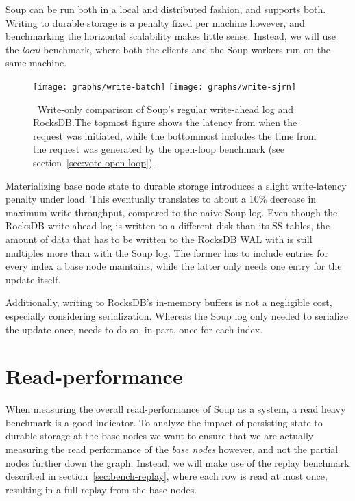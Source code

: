 Soup can be run both in a local and distributed fashion, and 
supports both. Writing to durable storage is a penalty fixed per machine
however, and benchmarking the horizontal scalability makes little sense.
Instead, we will use the \textit{local}  benchmark, where both the
clients and the Soup workers run on the same machine.

\begin{figure}[H]
  \centering
  \texttt{[image: graphs/write-batch]}
  \texttt{[image: graphs/write-sjrn]}
  \caption{\
    Write-only comparison of Soup's regular write-ahead log and RocksDB.\@ The
    topmost figure shows the latency from when the request was initiated, while
    the bottommost includes the time from the request was generated by the
    open-loop benchmark (see section~\ref{sec:vote-open-loop}).
  }\label{fig:graph-write}
\end{figure}

Materializing base node state to durable storage introduces a slight
write-latency penalty under load. This eventually translates to about a 10\%
decrease in maximum write-throughput, compared to the naive Soup log. Even
though the RocksDB write-ahead log is written to a different disk than its
SS-tables, the amount of data that has to be written to the RocksDB WAL with
\code{PersistentState} is still multiples more than with the Soup log. The
former has to include entries for every index a base node maintains, while the
latter only needs one entry for the update itself.

Additionally, writing to RocksDB's in-memory buffers is not a negligible cost,
especially considering serialization. Whereas the Soup log only needed to
serialize the update once, \code{PersistentState} needs to do so, in-part, once
for each index.


\section{Read-performance}

When measuring the overall read-performance of Soup as a system, a read heavy
\code{vote} benchmark is a good indicator. To analyze the impact of persisting
state to durable storage at the base nodes we want to ensure that we are
actually measuring the read performance of the \textit{base nodes} however, and
not the partial nodes further down the graph. Instead, we will make use of the
replay benchmark described in section~\ref{sec:bench-replay}, where each row is
read at most once, resulting in a full replay from the base nodes.


